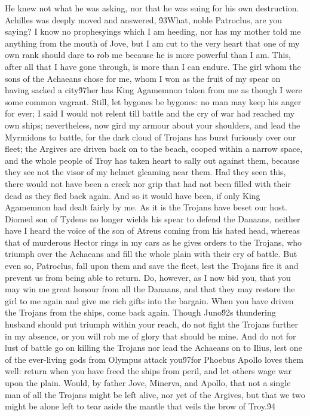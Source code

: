 {He knew not what he was asking, nor that he was suing for his own destruction. Achilles was deeply moved and answered, \'93What, noble Patroclus, are you saying? I know no prophesyings which I am heeding, nor has my mother told me anything from the mouth of Jove, but I am cut to the very heart that one of my own rank should dare to rob me because he is more powerful than I am. This, after all that I have gone through, is more than I can endure. The girl whom the sons of the Achaeans chose for me, whom I won as the fruit of my spear on having sacked a city\'97her has King Agamemnon taken from me as though I were some common vagrant. Still, let bygones be bygones: no man may keep his anger for ever; I said I would not relent till battle and the cry of war had reached my own ships; nevertheless, now gird my armour about your shoulders, and lead the Myrmidons to battle, for the dark cloud of Trojans has burst furiously over our fleet; the Argives are driven back on to the beach, cooped within a narrow space, and the whole people of Troy has taken heart to sally out against them, because they see not the visor of my helmet gleaming near them. Had they seen this, there would not have been a creek nor grip that had not been filled with their dead as they fled back again. And so it would have been, if only King Agamemnon had dealt fairly by me. As it is the Trojans have beset our host. Diomed son of Tydeus no longer wields his spear to defend the Danaans, neither have I heard the voice of the son of Atreus coming from his hated head, whereas that of murderous Hector rings in my cars as he gives orders to the Trojans, who triumph over the Achaeans and fill the whole plain with their cry of battle. But even so, Patroclus, fall upon them and save the fleet, lest the Trojans fire it and prevent us from being able to return. Do, however, as I now bid you, that you may win me great honour from all the Danaans, and that they may restore the girl to me again and give me rich gifts into the bargain. When you have driven the Trojans from the ships, come back again. Though Juno\'92s thundering husband should put triumph within your reach, do not fight the Trojans further in my absence, or you will rob me of glory that should be mine. And do not for lust of battle go on killing the Trojans nor lead the Achaeans on to Ilius, lest one of the ever-living gods from Olympus attack you\'97for Phoebus Apollo loves them well: return when you have freed the ships from peril, and let others wage war upon the plain. Would, by father Jove, Minerva, and Apollo, that not a single man of all the Trojans might be left alive, nor yet of the Argives, but that we two might be alone left to tear aside the mantle that veils the brow of Troy.\'94\
}
